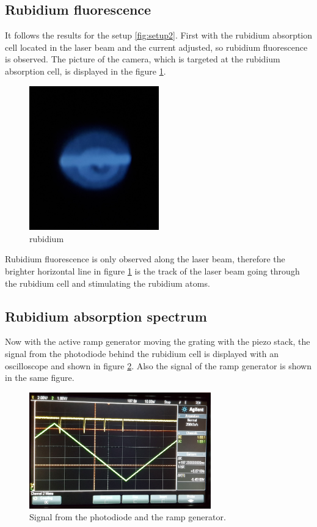 \subsection{Rubidium fluorescence}
\label{subsec:RB_fluorescence}

It follows the results for the setup \ref{fig:setup2}.
First with the rubidium absorption cell located in the laser beam
and the current adjusted, so rubidium fluorescence is observed. The picture of the
camera, which is targeted at the
rubidium absorption cell, is
displayed in the figure \ref{fig:Floures}.

\begin{figure}
  \centering
  \includegraphics[width = 0.5\textwidth]{figures/Rb_leuchten.jpg}
  \caption{rubidium }
  \label{fig:Floures}
\end{figure}

Rubidium fluorescence is only observed along the laser beam, therefore
the brighter horizontal line
in figure \ref{fig:Floures}
is the track of the laser beam
going through the rubidium cell and stimulating the rubidium atoms.


\subsection{Rubidium absorption spectrum}
\label{subsec:Rubidium_absorptionspectrum}


Now with the active ramp generator moving the grating with the piezo stack,
the signal from the photodiode behind the rubidium cell
is displayed with an oscilloscope and shown in figure \ref{fig:ramp}.
Also the signal of the ramp generator is shown in the same
figure.

\FloatBarrier
\begin{figure}
  \centering
  \includegraphics[width = 0.7\textwidth]{figures/Ramp.jpg}
  \caption{Signal from the photodiode and the ramp generator.}
  \label{fig:ramp}
\end{figure}
\FloatBarrier

